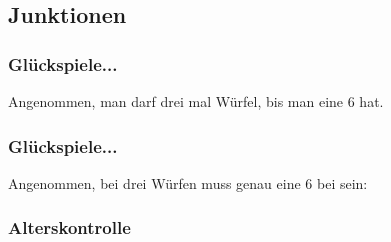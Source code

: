 \subsection{Junktionen}
\begin{frame}
	\frametitle{Glückspiele...}
	Angenommen, man darf drei mal Würfel, bis man eine 6 hat.
	
\end{frame}
\begin{frame}
	\frametitle{Glückspiele...}
	Angenommen, bei drei Würfen muss genau eine 6 bei sein:
	
\end{frame}
\begin{frame}
	\frametitle{Alterskontrolle}
	
\end{frame}
% 
%	
% 			
% 	
